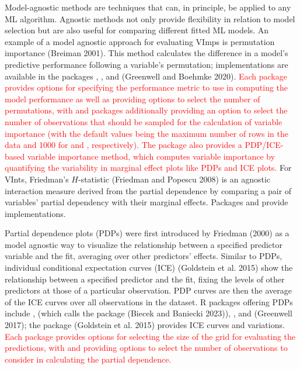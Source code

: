 Model-agnostic methods are techniques that can, in principle, be applied
to any ML algorithm. Agnostic methods not only provide flexibility in
relation to model selection but are also useful for comparing different
fitted ML models. An example of a model agnostic approach for evaluating
VImps is permutation importance (Breiman 2001). This method
calculates the difference in a model's predictive performance following
a variable's permutation; implementations are available in the packages , ,  and  (Greenwell and Boehmke 2020). \textcolor{red}{Each package provides options for specifying the performance metric to use in computing the model performance as well as providing options to select the number of permutations, with  and  packages additionally providing an option to select the number of observations that should be sampled for the calculation of variable importance (with the default values being the maximum number of rows in the data and 1000 for  and , respectively). The  package also provides a PDP/ICE-based variable importance method, which computes variable importance by quantifying the variability in marginal effect plots like PDPs and ICE plots.} For VInts, Friedman's \(H\)-statistic (Friedman and Popescu 2008) is an agnostic interaction measure derived from the partial dependence by comparing a pair of variables' partial dependency with their marginal
effects. Packages  and  provide implementations.

Partial dependence plots (PDPs) were first introduced by Friedman (2000) as
a model agnostic way to visualize the relationship between a specified
predictor variable and the fit, averaging over other predictors'
effects. Similar to PDPs, individual conditional expectation curves (ICE)
(Goldstein et al. 2015) show the relationship between a specified predictor and the
fit, fixing the levels of other predictors at those of a particular
observation. PDP curves are then the average of the ICE curves over all
observations in the dataset. R packages offering PDPs include
,  (which calls the  package (Biecek and Baniecki 2023)), , and  (Greenwell 2017);
the package  (Goldstein et al. 2015) provides ICE curves and variations. \textcolor{red}{Each package provides options for selecting the size of the grid for evaluating the predictions, with  and  providing options to select the number of observations to consider in calculating the partial dependence.}


